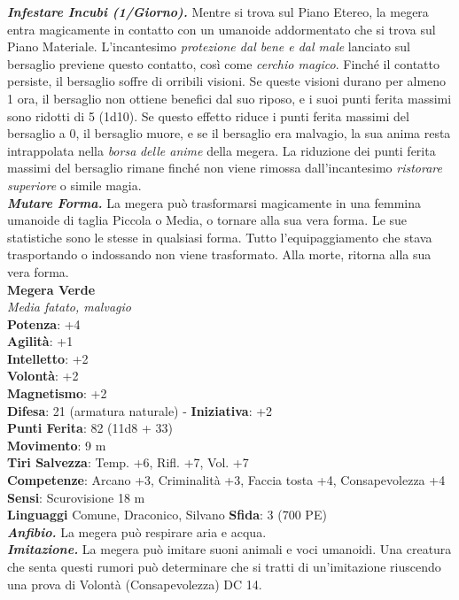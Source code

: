 \begin{multicols}{2}
\emph{\textbf{Infestare Incubi (1/Giorno).}} Mentre si trova sul Piano Etereo, la megera entra magicamente in contatto con un umanoide addormentato che si trova sul Piano Materiale. L'incantesimo \emph{protezione dal bene e dal male} lanciato sul bersaglio previene questo contatto, così come \emph{cerchio magico}. Finché il contatto persiste, il bersaglio soffre di orribili visioni. Se queste visioni durano per almeno 1 ora, il bersaglio non ottiene benefici dal suo riposo, e i suoi punti ferita massimi sono ridotti di 5 (1d10). Se questo effetto riduce i punti ferita massimi del bersaglio a 0, il bersaglio muore, e se il bersaglio era malvagio, la sua anima resta intrappolata nella \emph{borsa} \emph{delle anime} della megera. La riduzione dei punti ferita massimi del bersaglio rimane finché non viene rimossa dall'incantesimo \emph{ristorare} \emph{superiore} o simile magia.\\

\emph{\textbf{Mutare Forma.}} La megera può trasformarsi magicamente in una femmina umanoide di taglia Piccola o Media, o tornare alla sua vera forma. Le sue statistiche sono le stesse in qualsiasi forma. Tutto l'equipaggiamento che stava trasportando o indossando non viene trasformato. Alla morte, ritorna alla sua vera forma.\\

\medskip\textbf{Megera Verde}\\
\emph{Media fatato, malvagio}\\
\textbf{Potenza}: +4\\
\textbf{Agilità}: +1\\
\textbf{Intelletto}: +2\\
\textbf{Volontà}: +2\\
\textbf{Magnetismo}: +2\\
\textbf{Difesa}: 21 (armatura naturale) - \textbf{Iniziativa}: +2\\
\textbf{Punti Ferita}: 82 (11d8 + 33)\\
\textbf{Movimento}: 9 m\\
\textbf{Tiri Salvezza}: Temp. +6, Rifl. +7, Vol. +7\\
\textbf{Competenze}: Arcano +3, Criminalità +3, Faccia tosta +4, Consapevolezza +4\\
\textbf{Sensi}: Scurovisione 18 m\\
\textbf{Linguaggi} Comune, Draconico, Silvano
\textbf{Sfida}: 3 (700 PE)\smallskip\\
\emph{\textbf{Anfibio.}} La megera può respirare aria e acqua.\\
\emph{\textbf{Imitazione.}} La megera può imitare suoni animali e voci umanoidi. Una creatura che senta questi rumori può determinare che si tratti di un'imitazione riuscendo una prova di Volontà (Consapevolezza) DC 14.\\


\end{multicols}
